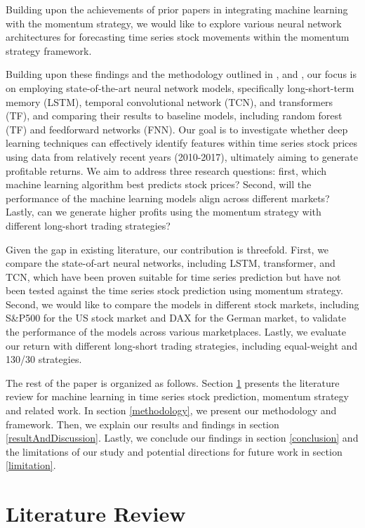 \documentclass{article}
\begin{document}
Building upon the achievements of prior papers in integrating machine learning with the momentum strategy, we would like to explore various neural network architectures for forecasting time series stock movements within the momentum strategy framework.

Building upon these findings and the methodology outlined in \cite{krauss2017deep}, \cite{fischer2018deep} and \cite{takeuchi2013applying}, our focus is on employing state-of-the-art neural network models, specifically long-short-term memory (LSTM), temporal convolutional network (TCN), and transformers (TF), and comparing their results to baseline models, including random forest (TF) and feedforward networks (FNN). Our goal is to investigate whether deep learning techniques can effectively identify features within time series stock prices using data from relatively recent years (2010-2017), ultimately aiming to generate profitable returns. We aim to address three research questions: first, which machine learning algorithm best predicts stock prices? Second, will the performance of the machine learning models align across different markets? Lastly, can we generate higher profits using the momentum strategy with different long-short trading strategies?

Given the gap in existing literature, our contribution is threefold. First, we compare the state-of-art neural networks, including LSTM, transformer, and TCN, which have been proven suitable for time series prediction but have not been tested against the time series stock prediction using momentum strategy. Second, we would like to compare the models in different stock markets, including S\&P500 for the US stock market and DAX for the German market, to validate the performance of the models across various marketplaces. Lastly, we evaluate our return with different long-short trading strategies, including equal-weight and 130/30 strategies. 

The rest of the paper is organized as follows. Section \ref{literatureReview} presents the literature review for machine learning in time series stock prediction, momentum strategy and related work. In section \ref{methodology}, we present our methodology and framework. Then, we explain our results and findings in section \ref{resultAndDiscussion}. Lastly, we conclude our findings in section \ref{conclusion} and the limitations of our study and potential directions for future work in section \ref{limitation}. 
\section{Literature Review}
\label{literatureReview}
\end{document}
